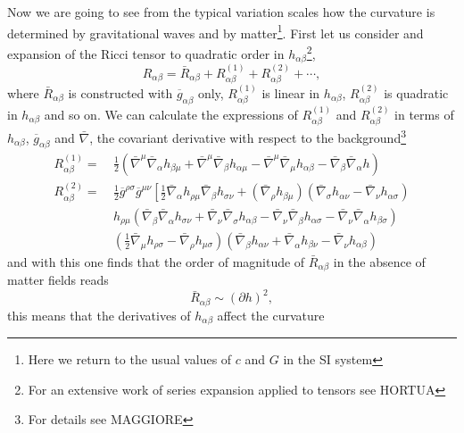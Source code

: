 Now we are going to see from the typical variation scales how the
curvature is determined by gravitational waves and by matter\footnote{Here we return to the usual values of $c$ and $G$ in the SI system}.
First let us consider and expansion of the Ricci tensor to quadratic
order in $h_{\alpha\beta}$\footnote{For an extensive work of series expansion applied to tensors see HORTUA},
\begin{equation}
R_{\alpha\beta}=\bar{R}_{\alpha\beta}+R_{\alpha\beta}^{(1)}+R_{\alpha\beta}^{(2)}+\cdots,\label{eq:rr}
\end{equation}
where $\bar{R}_{\alpha\beta}$ is constructed with $\overline{g}_{\alpha\beta}$
only, $R_{\alpha\beta}^{(1)}$ is linear in $h_{\alpha\beta}$, $R_{\alpha\beta}^{(2)}$
is quadratic in $h_{\alpha\beta}$ and so on. We can calculate the
expressions of $R_{\alpha\beta}^{(1)}$ and $R_{\alpha\beta}^{(2)}$
in terms of $h_{\alpha\beta}$, $\overline{g}_{\alpha\beta}$ and
$\bar{\nabla}$, the covariant derivative with respect to the background\footnote{For details see MAGGIORE}
\begin{align}
R_{\alpha\beta}^{(1)}= & \ \frac{1}{2}\left(\bar{\nabla}^{\mu}\bar{\nabla}_{\alpha}h_{\beta\mu}+\bar{\nabla}^{\mu}\bar{\nabla}_{\beta}h_{\alpha\mu}-\bar{\nabla}^{\mu}\bar{\nabla}_{\mu}h_{\alpha\beta}-\bar{\nabla}_{\beta}\bar{\nabla}_{\alpha}h\right)\label{eq:r1h}\\
R_{\alpha\beta}^{(2)}= & \ \frac{1}{2}\overline{g}^{\rho\sigma}\overline{g}^{\mu\nu}\left[\frac{1}{2}\bar{\nabla}_{\alpha}h_{\rho\mu}\bar{\nabla}_{\beta}h_{\sigma\nu}+\left(\bar{\nabla}_{\rho}h_{\beta\mu}\right)\left(\bar{\nabla}_{\sigma}h_{\alpha\nu}-\bar{\nabla}_{\nu}h_{\alpha\sigma}\right)\right.\nonumber \\
\  & \ h_{\rho\mu}\left(\bar{\nabla}_{\beta}\bar{\nabla}_{\alpha}h_{\sigma\nu}+\bar{\nabla}_{\nu}\bar{\nabla}_{\sigma}h_{\alpha\beta}-\bar{\nabla}_{\nu}\bar{\nabla}_{\beta}h_{\alpha\sigma}-\bar{\nabla}_{\nu}\bar{\nabla}_{\alpha}h_{\beta\sigma}\right)\nonumber \\
\  & \ \left(\frac{1}{2}\bar{\nabla}_{\mu}h_{\rho\sigma}-\bar{\nabla}_{\rho}h_{\mu\sigma}\right)\left(\bar{\nabla}_{\beta}h_{\alpha\nu}+\bar{\nabla}_{\alpha}h_{\beta\nu}-\bar{\nabla}_{\nu}h_{\alpha\beta}\right)\label{eq:r2h}
\end{align}
 and with this one finds that the order of magnitude of $\bar{R}_{\alpha\beta}$
in the absence of matter fields reads
\[
\bar{R}_{\alpha\beta}\sim\left(\partial h\right)^{2},
\]
this means that the derivatives of $h_{\alpha\beta}$ affect the curvature
